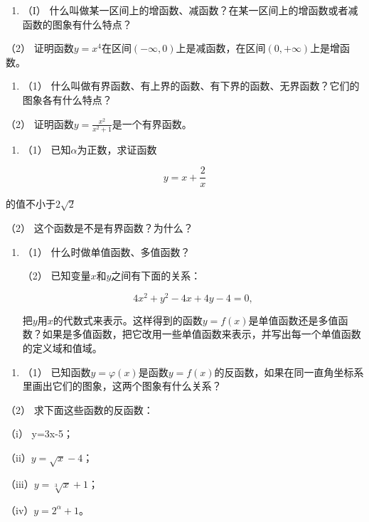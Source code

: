\begin{enumerate}[start=15]
\item
  （I）
  什么叫做某一区间上的增函数、减函数？在某一区间上的增函数或者减函数的图象有什么特点？
\end{enumerate}

（2）
证明函数\(y = x^4\)在区间\((- \infty, 0)\)上是减函数，在区间\((0, +\infty)\)上是增函数。

\begin{enumerate}[start=16]
\item
  （1）
  什么叫做有界函数、有上界的函数、有下界的函数、无界函数？它们的图象各有什么特点？
\end{enumerate}

（2） 证明函数\(y = \frac{x^2}{x^2 + 1}\)是一个有界函数。

\begin{enumerate}[start=17]
\item
  （1） 已知\(\alpha\)为正数，求证函数
\end{enumerate}

\[
y = x + \frac{2}{x}
\]

的值不小于\(2\sqrt{2}\)

（2） 这个函数是不是有界函数？为什么？

\begin{enumerate}[start=18,label={*\arabic*.}]
\item
  （1） 什么时做单值函数、多值函数？

（2） 已知变量\(x\)和\(y\)之间有下面的关系：

\[
4 x^{2} + y^{2} - 4 x + 4 y - 4 = 0,
\]

把\(y\)用\(x\)的代数式来表示。这样得到的函数\(y = f(x)\)是单值函数还是多值函数？如果是多值函数，把它改用一些单值函数来表示，并写出每一个单值函数的定义域和值域。

\end{enumerate}
\begin{enumerate}[start=19]
\item
  （1）
  已知函数\(y = \varphi(x)\)是函数\(y = f(x)\)的反函数，如果在同一直角坐标系里画出它们的图象，这两个图象有什么关系？
\end{enumerate}

（2） 求下面这些函数的反函数：

（i） y=3x-5；

（ii）\(y = \sqrt{x} - 4\)；

（iii）\(y = \sqrt[3]{x} + 1\)；

（iv）\(y = 2^{\alpha} + 1\)。


